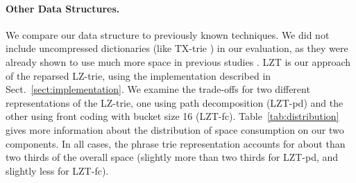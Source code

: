 \documentclass{llncs}
\begin{document}
\begin{table}[t]
\caption{The compression ratio of our data structure broken down into its two components. All percentages are in relation to the original file size.}
\label{tab:distribution}
\centering
{}
\end{table}
\paragraph{Other Data Structures.}
We compare our data structure to previously known techniques.
We did not include uncompressed dictionaries (like TX-trie \cite{tx}) in our evaluation, as they were already shown to use much more space in previous studies \cite{brisaboa11compressed,grossi12fast}.
LZT is our approach of the reparsed LZ-trie, using the implementation described in Sect.~\ref{sect:implementation}. We examine the trade-offs for two different representations of the LZ-trie, one using path decomposition (LZT-pd) and the other using front coding with bucket size 16 (LZT-fc).
Table~\ref{tab:distribution} gives more information about the distribution of space consumption on our two components. In all cases, the phrase trie representation accounts for about than two thirds of the overall space (slightly more than two thirds for LZT-pd, and slightly less for LZT-fc).
\end{document}
